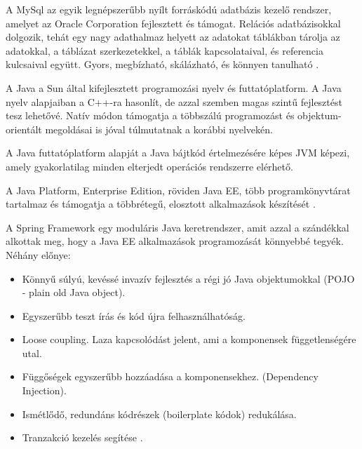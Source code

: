 



A MySql az egyik legnépszerűbb nyílt forráskódú adatbázis kezelő rendszer, amelyet az Oracle Corporation fejlesztett és támogat. Relációs adatbázisokkal dolgozik, tehát egy nagy adathalmaz helyett az adatokat táblákban tárolja az adatokkal, a táblázat szerkezetekkel, a táblák kapcsolataival, és referencia kulcsaival együtt. Gyors, megbízható, skálázható, és könnyen tanulható \cite{mysql}.

A Java a Sun által kifejlesztett programozási nyelv és futtatóplatform. A Java nyelv alapjaiban a C++-ra hasonlít, de azzal szemben magas szintű fejlesztést tesz lehetővé. Natív módon támogatja a többszálú programozást és objektum-orientált megoldásai is jóval túlmutatnak a korábbi nyelvekén.

A Java futtatóplatform alapját a Java bájtkód értelmezésére képes JVM képezi, amely gyakorlatilag minden elterjedt operációs rendszerre elérhető.

A Java Platform, Enterprise Edition, röviden Java EE, több programkönyvtárat tartalmaz és támogatja a többrétegű, elosztott alkalmazások készítését \cite{javaee}.

A Spring Framework egy moduláris Java keretrendszer, amit azzal a szándékkal alkottak meg, hogy a Java EE alkalmazások programozását könnyebbé tegyék. Néhány előnye:
\begin{itemize}
	\item Könnyű súlyú, kevéssé invazív fejlesztés a régi jó Java objektumokkal (POJO - plain old Java object).
	\item Egyszerűbb teszt írás és kód újra felhasználhatóság.
	\item Loose coupling. Laza kapcsolódást jelent, ami a komponensek függetlenségére utal.
	\item Függőségek egyszerűbb hozzáadása a komponensekhez. (Dependency Injection).
	\item Ismétlődő, redundáns kódrészek (boilerplate kódok) redukálása.
	\item Tranzakció kezelés segítése \cite{spring}.
\end{itemize}

